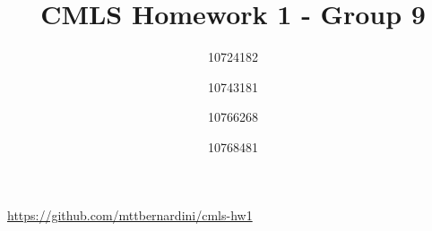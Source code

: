 \documentclass[a4paper,11pt]{article}
\title{CMLS Homework 1 - Group 9}
\author{10724182 \and 10743181 \and 10766268 \and 10768481}
\date{}
\begin{document}
	\maketitle
	{\hfill\url{https://github.com/mttbernardini/cmls-hw1}}


	
	
\end{document}
